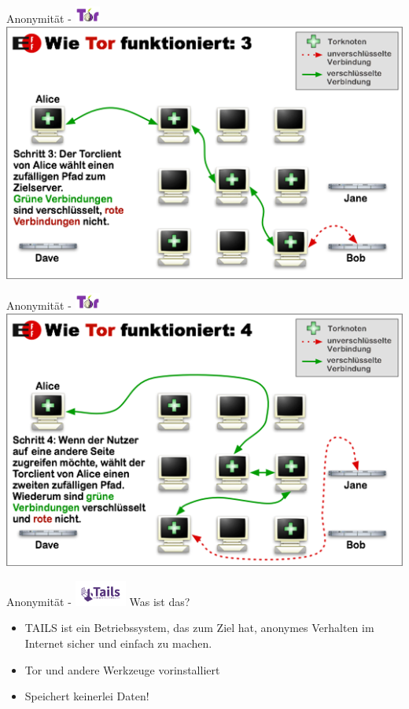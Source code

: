 \documentclass{beamer}
\begin{document}
\begin{frame}{Anonymität - \includegraphics[align=c,height=1.5em]{tor.jpg}}
    \centering\includegraphics[height=0.7\textheight]{tor3.png}
\end{frame}

\begin{frame}{Anonymität - \includegraphics[align=c,height=1.5em]{tor.jpg}}
    \centering\includegraphics[height=0.7\textheight]{tor4.png}
\end{frame}

\begin{frame}{Anonymität - \includegraphics[align=c,height=2.3em]{tails.png}}
	Was ist das?
	\begin{itemize}
		\item TAILS ist ein Betriebssystem, das zum Ziel hat, anonymes Verhalten im Internet sicher und einfach zu machen.
		\item Tor und andere Werkzeuge vorinstalliert
                \item Speichert keinerlei Daten!
	\end{itemize}
\end{frame}
\end{document}
